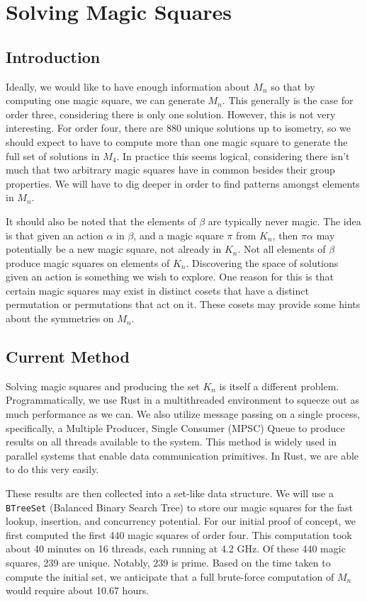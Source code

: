 \documentclass{rhumj_new}
\begin{document}
\section{Solving Magic Squares}

\subsection{Introduction}

Ideally, we would like to have enough information about $M_n$ so that by computing one magic
square, we can generate $M_n$. This generally is the case for order three, considering there is
only one solution. However, this is not very interesting. For order four, there are 880 unique
solutions up to isometry, so we should expect to have to compute more than one magic square to
generate the full set of solutions in $M_4$. In practice this seems logical, considering there
isn't much that two arbitrary magic squares have in common besides their group properties. We will
have to dig deeper in order to find patterns amongst elements in $M_n$.

It should also be noted that the elements of $\beta$ are typically never magic. The idea is
that given an action $\alpha$ in $\beta$, and a magic square $\pi$ from $K_n$, then $\pi\alpha$ may
potentially be a new magic square, not already in $K_n$. Not all elements of $\beta$ produce magic
squares on elements of $K_n$. Discovering the space of solutions given an action is something we
wish to explore. One reason for this is that certain magic squares may exist in distinct cosets
that have a distinct permutation or permutations that act on it. These cosets may provide some
hints about the symmetries on $M_n$.

\subsection{Current Method}

Solving magic squares and producing the set $K_n$ is itself a different problem.
Programmatically, we use Rust in a multithreaded environment to squeeze out as much performance as
we can. We also utilize message passing on a single process, specifically, a Multiple Producer,
Single Consumer (MPSC) Queue to produce results on all threads available to the system. This method
is widely used in parallel systems that enable data communication primitives. In Rust, we are able
to do this very easily.

These results are then collected into a set-like data structure. We will use a
\texttt{BTreeSet} (Balanced Binary Search Tree) to store our magic squares for the fast lookup,
insertion, and concurrency potential. For our initial proof of concept, we first computed the first
440 magic squares of order four. This computation took about 40 minutes on 16 threads, each running
at 4.2 GHz. Of these 440 magic squares, 239 are unique. Notably, 239 is prime. Based on the time
taken to compute the initial set, we anticipate that a full brute-force computation of $M_n$ would
require about 10.67 hours.
\end{document}
